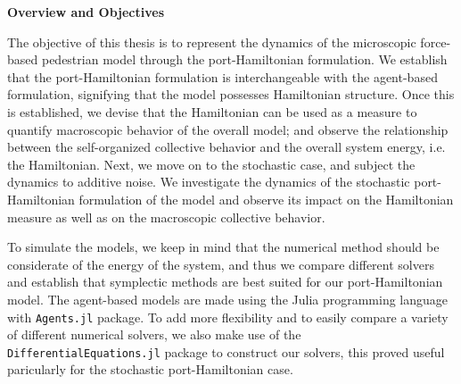 \textbf{Overview and Objectives}

The objective of this thesis is to represent the dynamics of the microscopic force-based pedestrian model through the port-Hamiltonian formulation. We establish that the port-Hamiltonian formulation is interchangeable with the agent-based formulation, signifying that the model possesses Hamiltonian structure. Once this is established, we devise that the Hamiltonian can be used as a measure to quantify macroscopic behavior of the overall model; and observe the relationship between the self-organized collective behavior and the overall system energy, i.e. the Hamiltonian. Next, we move on to the stochastic case, and subject the dynamics to additive noise. We investigate the dynamics of the stochastic port-Hamiltonian formulation of the model and observe its impact on the Hamiltonian measure as well as on the macroscopic collective behavior.

To simulate the models, we keep in mind that the numerical method should be considerate of the energy of the system, and thus we compare different solvers and establish that symplectic methods are best suited for our port-Hamiltonian model. The agent-based models are made using the Julia programming language with \texttt{Agents.jl} \cite{Agents.jl} package. To add more flexibility and to easily compare a variety of different numerical solvers, we also make use of the \texttt{DifferentialEquations.jl} \cite{rackauckas2017differentialequations} package to construct our solvers, this proved useful paricularly for the stochastic port-Hamiltonian case.




